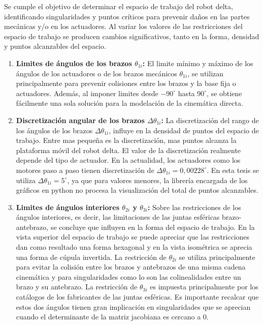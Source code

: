             Se cumple el objetivo de determinar el espacio de trabajo del robot delta, identificando singularidades y puntos críticos  para prevenir daños en las partes mecánicas y/o en los actuadores. Al variar los valores de las restricciones del espacio de trabajo se producen cambios significativos, tanto en la forma, densidad y puntos alcanzables del espacio.
                \begin{enumerate}
                    \item  {\textbf{Limites de ángulos de los brazos  $\theta_{1i}$:  }El limite mínimo y máximo de los ángulos de los actuadores o de los brazos mecánicos $\theta_{1i}$, se utilizan principalmente para prevenir colisiones entre los brazos y la base fija o actuadores. Además, al imponer limites desde ${-90}^\circ$ hasta ${90}^\circ$, se obtiene fácilmente una sola solución para la modelación de la cinemática directa.}
                    \item {\textbf{Discretización angular de los brazos  $\Delta\theta_{1i}$:  }La discretización del rango de los ángulos de los brazos $\Delta\theta_{1i}$, influye en la densidad de puntos del espacio de trabajo. Entre mas pequeña es la discretización, mas puntos alcanza la plataforma móvil del robot delta. El valor de la discretización realmente depende del tipo de actuador. En la actualidad, los actuadores como los motores paso a paso tienen discretización  de ${\Delta\theta}_{1i}={0,00228}^{\circ}$. En esta tesis se utiliza  ${\Delta\theta}_{1i}={5}^{\circ}$, ya que para valores menores, la librería encargada de los gráficos en python no procesa la visualización del total de puntos alcanzables.} 
                    \item{\textbf{Limites de ángulos interiores $\theta_{2i}$ y $\theta_{3i}$:  }Sobre las restricciones de los ángulos interiores, es decir, las limitaciones de las juntas esféricas brazo-antebrazo, se concluye que influyen en la forma del espacio de trabajo. En la vista superior del espacio de trabajo se puede apreciar que las restricciones dan como resultado una forma hexagonal y en la vista isométrica se aprecia una forma de cúpula invertida. La restricción de $\theta_{2i}$ se utiliza principalmente para evitar la colisión entre los brazos y antebrazos de una misma cadena cinemática y para singularidades como lo son las colinealidades entre un brazo y su antebrazo. La restricción de $\theta_{3i}$ es impuesta principalmente por los catálogos de los fabricantes de las juntas esféricas.  Es importante recalcar que estos dos ángulos tienen gran implicación en singularidades que se aprecian cuando el determinante de la matriz jacobiana es cercano a 0.}

\end{enumerate}
